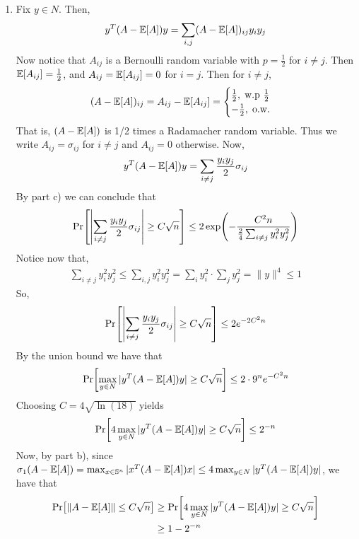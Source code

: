 \documentclass[12pt]{article}
\theoremstyle{definitionstyle}
\def\mbb#1{\mathbb{#1}}
\newcommand{\mg}[1]{\| #1 \|}
\renewcommand{\P}{\mathrm{Pr}\qty}
\newcommand{\E}{\mathbb{E}\qty}
\renewcommand{\S}{\mbb S}
\begin{document}
\begin{enumerate}[leftmargin=\labelsep]
\begin{enumerate}
			\item Fix $y \in N$. Then,
			\begin{align*}
				y^T(A-\E[A])y = \sum_{i, j} (A-\E[A])_{ij} y_i y_j
			\end{align*}
			Now notice that $A_{ij}$ is a Bernoulli random variable with $p = \frac12$ for $i \neq j$. Then $\E[A_{ij}] = \frac12$, and $A_{ij} = \E[A_{ij}] = 0$ for $i = j$. Then for $i \neq j$, \begin{align*}
				(A-\E[A])_{ij} = A_{ij} - \E[A_{ij}] = \begin{cases}
					\frac12, \; \text{w.p } \frac12 \\
					-\frac12, \; \text{o.w.}
				\end{cases}
			\end{align*}
			That is, $(A-\E[A])$ is 1/2 times a Radamacher random variable. Thus we write $A_{ij} = \sigma_{ij}$ for $i \neq j$ and $A_{ij} = 0$ otherwise. Now,
			\begin{align*}
				y^T(A-\E[A])y = \sum_{i \neq j} \frac{y_iy_j}{2} \sigma_{ij}
			\end{align*}
			By part c) we can conclude that
			\begin{align*}
				\P[\qty|\sum_{i \neq j} \frac{y_iy_j}{2} \sigma_{ij}| \geq C\sqrt{n}] \leq 2\exp(-\frac{C^2n}{\frac{2}{4}\sum_{i \neq j} y_i^2 y_j^2})
			\end{align*}
			Notice now that,
			\begin{align*}
				\sum_{i \neq j} y_i^2y_j^2 \leq \sum_{i, j} y_i^2 y_j^2 = \sum_{i} y_i^2 \cdot \sum_{j} y_j^2 = \mg{y}^4 \leq 1
			\end{align*}
			So,
			\begin{align*}
				\P[\qty|\sum_{i \neq j} \frac{y_iy_j}{2} \sigma_{ij}| \geq C\sqrt{n}] \leq 2e^{-2C^2n}
			\end{align*}
			By the union bound we have that
			\begin{align*}
				\Pr[\max_{y \in N}|y^T(A - \E[A])y| \geq C\sqrt{n}] \leq 2 \cdot 9^n e^{-C^2n}
			\end{align*}
			Choosing $C = 4\sqrt{\ln(18)}$ yields
			\begin{align*}
				\Pr[4\max_{y \in N} |y^T(A - \E[A])y| \geq C\sqrt{n}] \leq 2^{-n}
			\end{align*}
			Now, by part b), since $\sigma_1(A - \E[A]) = \max_{x \in \S^n} |x^T(A - \E[A])x| \leq 4\max_{y \in N}|y^T(A - \E[A])y|$, we have that
			\begin{align*}
				\Pr[\mg{A - \E[A]} \leq C\sqrt{n}] &\geq \Pr[4\max_{y \in N} |y^T(A - \E[A])y| \geq C\sqrt{n}] \\
				&\geq 1 - 2^{-n}
			\end{align*}
			\end{enumerate}
	\end{enumerate}
\end{document}

